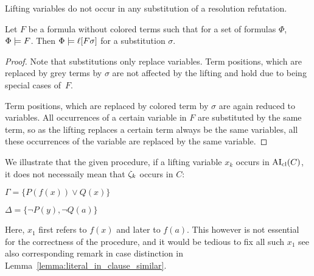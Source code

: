\documentclass[,%
	paper=a4,%
	DIV12, %
	twoside=false,%
	liststotoc,
	bibtotoc,
	draft=false,%
	numbers=noendperiod
]{scrartcl}
\begin{document}
\begin{lemma}
	\label{lemma:no_lifting_vars_in_subst}
	Lifting variables do not occur in any substitution of a resolution refutation.
\end{lemma}

\begin{lemma}
	\label{lemma:substitute_and_lift}
	Let $F$ be a formula without colored terms such that for a set of formulas $\Phi$, $\Phi \models F$.
	Then $\Phi \models \ell[F\sigma]$ for a substitution $\sigma$.
\end{lemma}
\begin{proof}
	Note that substitutions only replace variables. Term positions, which are replaced by grey terms by $\sigma$ are not affected by the lifting and hold due to being special cases of~$F$.

	Term positions, which are replaced by colored term by $\sigma$ are again reduced to variables.
	All occurrences of a certain variable in $F$ are substituted by the same term, so as the lifting replaces a certain term always be the same variables, all these occurrences of the variable are replaced by the same variable.
\end{proof}

\begin{exa} 
	\label{exa:lifting_var_refers_to_different_term}
	We illustrate that the given procedure, if a lifting variable $x_k$ occurs in $\operatorname{AI}_\mathrm{cl}(C)$, it does not necessaily mean that $\zeta_{k}$ occurs in $C$:

	$\Gamma = \{P(f(x))\lor Q(x)\}$

	$\Delta = \{\lnot P(y), \lnot Q(a)\}$
	\begin{prooftree}



	\end{prooftree}
	Here, $x_1$ first refers to $f(x)$ and later to $f(a)$.
	This however is not essential for the correctness of the procedure, and it would be tedious to fix all such $x_1$ see also corresponding remark in case distinction in Lemma~\ref{lemma:literal_in_clause_similar}.
\end{exa} 
\end{document}
